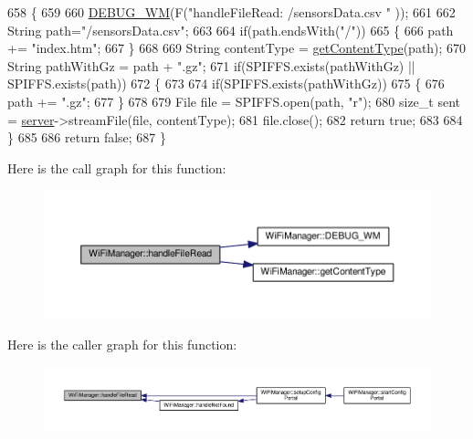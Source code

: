 \begin{DoxyCode}
658 \{
659 
660     \hyperlink{class_wi_fi_manager_ae5f595c670ccbcf9a191baf50f5c7c26}{DEBUG\_WM}(F(\textcolor{stringliteral}{"handleFileRead: /sensorsData.csv "} ));
661 
662     String path=\textcolor{stringliteral}{"/sensorsData.csv"};
663 
664     \textcolor{keywordflow}{if}(path.endsWith(\textcolor{stringliteral}{"/"}))
665     \{
666         path += \textcolor{stringliteral}{"index.htm"};
667     \}
668 
669     String contentType = \hyperlink{class_wi_fi_manager_a40f123fd290c3e331c9785d19a88f3b8}{getContentType}(path);
670     String pathWithGz = path + \textcolor{stringliteral}{".gz"};
671     \textcolor{keywordflow}{if}(SPIFFS.exists(pathWithGz) || SPIFFS.exists(path))
672     \{
673 
674         \textcolor{keywordflow}{if}(SPIFFS.exists(pathWithGz))
675         \{
676             path += \textcolor{stringliteral}{".gz"};
677         \}
678 
679         File file = SPIFFS.open(path, \textcolor{stringliteral}{"r"});
680         \textcolor{keywordtype}{size\_t} sent = \hyperlink{class_wi_fi_manager_a509523a01c0395cf0dc235b074f2a5ea}{server}->streamFile(file, contentType);
681         file.close();
682         \textcolor{keywordflow}{return} \textcolor{keyword}{true};
683 
684     \}
685 
686     \textcolor{keywordflow}{return} \textcolor{keyword}{false};
687 \}
\end{DoxyCode}
Here is the call graph for this function\+:\nopagebreak
\begin{figure}[H]
\begin{center}
\leavevmode
\includegraphics[width=350pt]{d4/dc8/class_wi_fi_manager_abed7fbbdab409fc8aba2a5c00f3d2db1_cgraph}
\end{center}
\end{figure}
Here is the caller graph for this function\+:\nopagebreak
\begin{figure}[H]
\begin{center}
\leavevmode
\includegraphics[width=350pt]{d4/dc8/class_wi_fi_manager_abed7fbbdab409fc8aba2a5c00f3d2db1_icgraph}
\end{center}
\end{figure}
\mbox{\label{class_wi_fi_manager_ac35e46661f8a209d84bba62d9aa43a35}} 
